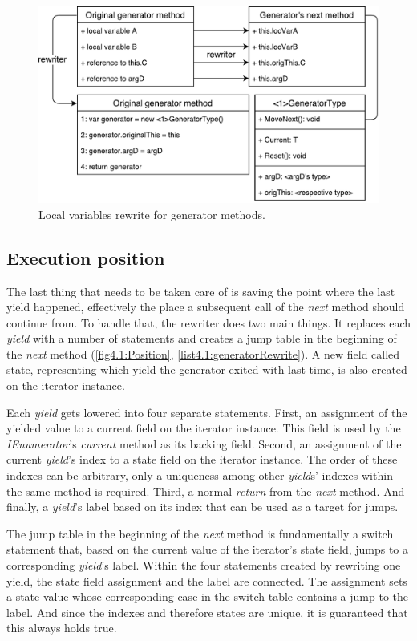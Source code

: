 \begin{figure}[h]
	\centering	
	\includegraphics[scale=0.70]{../img/4_1_localVars}	
	\caption{Local variables rewrite for generator methods.}
	\label{fig4.1:LocVars}
\end{figure}

\subsection{Execution position}

The last thing that needs to be taken care of is saving the point where the last yield happened, effectively the place a subsequent call of the \emph{next} method should continue from. To handle that, the rewriter does two main things. It replaces each \emph{yield} with a number of statements and creates a jump table in the beginning of the \emph{next} method (\autoref{fig4.1:Position}, \autoref{list4.1:generatorRewrite}). A new field called state, representing which yield the generator exited with last time, is also created on the iterator instance.

Each \emph{yield} gets lowered into four separate statements. First, an assignment of the yielded value to a current field on the iterator instance. This field is used by the \emph{IEnumerator}'s \emph{current} method as its backing field. Second, an assignment of the current \emph{yield}’s index to a state field on the iterator instance. The order of these indexes can be arbitrary, only a uniqueness among other \emph{yield}s' indexes within the same method is required. Third, a normal \emph{return} from the \emph{next} method. And finally, a \emph{yield}’s label based on its index that can be used as a target for jumps.

The jump table in the beginning of the \emph{next} method is fundamentally a switch statement that, based on the current value of the iterator’s state field, jumps to a corresponding \emph{yield}'s label. Within the four statements created by rewriting one yield, the state field assignment and the label are connected. The assignment sets a state value whose corresponding case in the switch table contains a jump to the label. And since the indexes and therefore states are unique, it is guaranteed that this always holds true.

